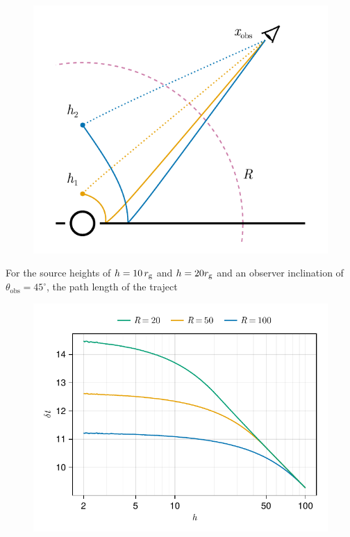 \begin{figure}
	\centering
	\includegraphics[width=0.80\linewidth]{figures/continuum-time.figure.pdf}
	\caption{}
	\label{fig:app:weak-field-approx}
\end{figure}

For the source heights of $h=10\, r_\text{g}$ and $h = 20 r_\text{g}$ and an observer inclination of $\theta_\text{obs} = 45^\circ$, the path length of the traject


\begin{figure}
	\centering
	\includegraphics[width=0.98\linewidth]{figures/continuum-time.weak-field.pdf}
	\caption{}
	\label{fig:app:continuum-time}
\end{figure}